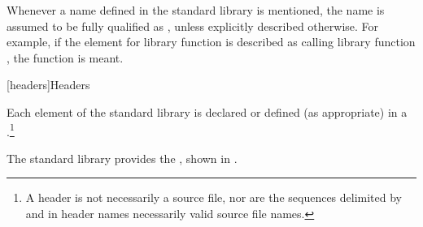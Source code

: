 \pnum
Whenever a name  defined in the standard library is mentioned,
the name  is assumed to be fully qualified as
,
unless explicitly described otherwise. For example, if the \effects element
for library function  is described as calling library function ,
the function
is meant.

[headers]{Headers}

\pnum
Each element of the \Cpp{} standard library is declared or defined (as appropriate) in a
.\footnote{A header is not necessarily a source file, nor are the
sequences delimited by \tcode{<} and \tcode{>} in header names necessarily valid source
file names.}

\pnum
The \Cpp{} standard library provides the
,
shown in .

